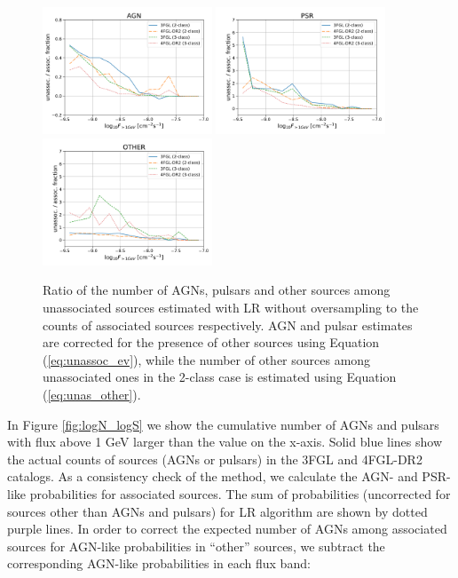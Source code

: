 \begin{figure}[h]
\center
\includegraphics[width=0.45\textwidth]{plots/N_logS_diff_AGN.pdf}
\includegraphics[width=0.45\textwidth]{plots/N_logS_diff_PSR.pdf}
\includegraphics[width=0.45\textwidth]{plots/N_logS_diff_OTHER.pdf}
\caption{Ratio of the number of AGNs, pulsars and other sources among unassociated sources estimated with LR without oversampling
to the counts of associated sources respectively.
AGN and pulsar estimates are corrected for the presence of other sources using Equation (\ref{eq:unassoc_ev}),
while the number of other sources among unassociated ones in the 2-class case is estimated using Equation (\ref{eq:unas_other}).
} 
\label{fig:unass_vs_ass_frac}
\end{figure}


In Figure \ref{fig:logN_logS} we show the cumulative number of AGNs and pulsars with flux above 1 GeV larger than the
value on the x-axis.
Solid blue lines show the actual counts of sources (AGNs or pulsars) in the 3FGL and 4FGL-DR2 catalogs.
As a consistency check of the method, we calculate the AGN- and PSR-like probabilities for associated sources.
The sum of probabilities (uncorrected for sources other than AGNs and pulsars) for LR algorithm are shown by dotted purple lines.
In order to correct the expected number of AGNs among associated sources for AGN-like probabilities in ``other'' sources, 
we subtract the corresponding AGN-like probabilities in each flux band:


